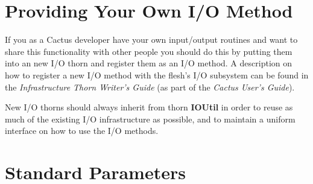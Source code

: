 \documentclass{article}
\begin{document}
\section{Providing Your Own I/O Method}

If you as a Cactus developer have your own input/output routines and want to
share this functionality with other people you should do this by putting them
into an new I/O thorn and register them as an I/O method.
A description on how to register a new I/O method with the flesh's I/O subsystem
can be found in the {\it Infrastructure Thorn Writer's Guide} (as part of the
{\it Cactus User's Guide}).

New I/O thorns should always inherit from thorn {\bf IOUtil} in order
to reuse as much of the existing I/O infrastructure as possible, and to maintain
a uniform interface on how to use the I/O methods.


%
%
%
%
%
%

\section{Standard Parameters}
\end{document}
